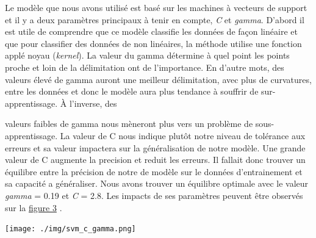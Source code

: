 \documentclass[12pt]{extarticle}
\let\cite\parencite
\begin{document}
Le modèle que nous avons utilisé est basé sur les machines à vecteurs de support et il y a deux paramètres principaux à tenir en compte, \emph{C} et \emph{gamma}. D'abord il est utile de comprendre que ce modèle classifie les données de façon linéaire et que pour classifier des données de non linéaires, la méthode utilise une fonction applé noyau (\emph{kernel}). La valeur du gamma détermine à quel point les points proche et loin de la délimitation ont de l'importance. En d'autre mots, des valeurs élevé de gamma auront une meilleur délimitation, avec plus de curvatures, entre les données et donc le modèle aura plus tendance à souffrir de sur-apprentissage. À l'inverse, des
\begin{minipage}{.45\textwidth}
\vspace*{2.5mm}
valeurs faibles de gamma nous mèneront plus vers un problème de sous-apprentissage. La valeur de C nous indique plutôt notre niveau de tolérance aux erreurs et sa valeur impactera sur la généralisation de notre modèle. Une grande valeur de C augmente la precision et reduit les erreurs. Il fallait donc trouver un équilibre entre la précision de notre de modèle sur le données d'entrainement et sa capacité a généraliser. Nous avons trouver un équilibre optimale avec le valeur \emph{gamma} = 0.19 et \emph{C} = 2.8. Les impacts de ses paramètres peuvent être observés sur la \hyperref[fig:svm_c_gamma]{figure 3} \cite{support_vector_machines}.
\end{minipage}
\begin{minipage}{.55\textwidth}
\vspace*{1mm}
\vspace*{-5mm}
\begin{center}
\texttt{[image: ./img/svm\_c\_gamma.png]}
\end{center}
\label{fig:svm_c_gamma}
\end{minipage}
\end{document}
